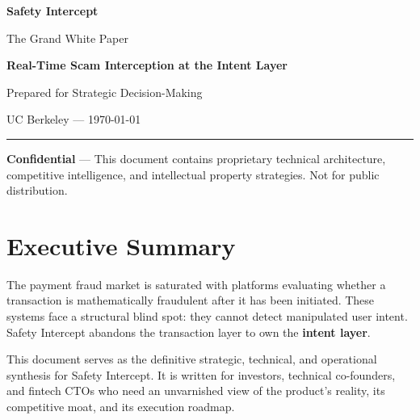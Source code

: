 \documentclass[12pt, letterpaper]{article}
\begin{document}
\begin{titlepage}
    \centering
    \vspace*{3cm}
    {\Huge\bfseries Safety Intercept\par}
    \vspace{0.5cm}
    {\LARGE The Grand White Paper\par}
    \vspace{2cm}
    {\Large \textbf{Real-Time Scam Interception at the Intent Layer}\par}
    \vspace{3cm}
    {\large Prepared for Strategic Decision-Making\par}
    \vspace{0.5cm}
    {\large UC Berkeley — \today\par}
    \vspace{3cm}
    \rule{0.8\textwidth}{0.4pt}
    \vspace{0.5cm}
    {\footnotesize \textbf{Confidential} — This document contains proprietary technical architecture, competitive intelligence, and intellectual property strategies. Not for public distribution.\par}
\end{titlepage}

\tableofcontents
\newpage

\section{Executive Summary}
The payment fraud market is saturated with platforms evaluating whether a transaction is mathematically fraudulent after it has been initiated. These systems face a structural blind spot: they cannot detect manipulated user intent. Safety Intercept abandons the transaction layer to own the \textbf{intent layer}.

This document serves as the definitive strategic, technical, and operational synthesis for Safety Intercept. It is written for investors, technical co-founders, and fintech CTOs who need an unvarnished view of the product's reality, its competitive moat, and its execution roadmap.
\end{document}
